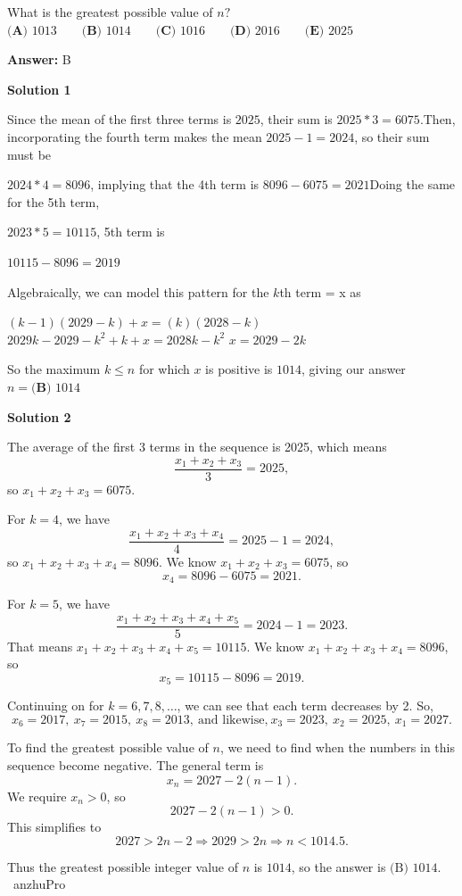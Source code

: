 \begin{enumerate}
 What is the greatest possible value of ${n?}$
$\textbf{(A) } 1013 \qquad \textbf{(B) } 1014 \qquad \textbf{(C) } 1016 \qquad \textbf{(D) } 2016 \qquad \textbf{(E) } 2025$

 \textbf{Answer: }B



\textbf{Solution 1}

Since the mean of the first three terms is $2025$, their sum is $2025 * 3 = 6075$.Then, incorporating the fourth term makes the mean $2025-1=2024$, so their sum must be 

 $2024 * 4 = 8096$, implying that the 4th term is $8096-6075=2021$Doing the same for the 5th term,

 $2023 * 5= 10115$, 5th term is 

 $10115-8096=2019$

 Algebraically, we can model this pattern for the $k$th term = x as

 $(k-1)(2029-k) + x = (k)(2028-k)$
$2029k-2029-k^2+k+x=2028k-k^2$
$x=2029-2k$

 So the maximum $k\le n$ for which $x$ is positive is $1014$, giving our answer $n=\boxed{\textbf{(B) }1014}$




\textbf{Solution 2}

The average of the first 3 terms in the sequence is 2025, which means 
 \[\frac{x_1 + x_2 + x_3}{3} = 2025,\] so $x_1 + x_2 + x_3 = 6075$.

 For $k = 4$, we have 
 \[\frac{x_1 + x_2 + x_3 + x_4}{4} = 2025 - 1 = 2024,\] so $x_1 + x_2 + x_3 + x_4 = 8096$. We know $x_1 + x_2 + x_3 = 6075$, so 
 \[x_4 = 8096 - 6075 = 2021.\]

 For $k = 5$, we have 
 \[\frac{x_1 + x_2 + x_3 + x_4 + x_5}{5} = 2024 - 1 = 2023.\] That means $x_1 + x_2 + x_3 + x_4 + x_5 = 10115$. We know $x_1 + x_2 + x_3 + x_4 = 8096$, so 
 \[x_5 = 10115 - 8096 = 2019.\]

 Continuing on for $k = 6, 7, 8, \ldots$, we can see that each term decreases by 2. So, 
 \[x_6 = 2017,\ x_7 = 2015,\ x_8 = 2013,\ \text{and likewise,}\ x_3 = 2023,\ x_2 = 2025,\ x_1 = 2027.\]

 To find the greatest possible value of $n$, we need to find when the numbers in this sequence become negative. The general term is 
 \[x_n = 2027 - 2(n-1).\] We require $x_n > 0$, so 
 \[2027 - 2(n-1) > 0.\] This simplifies to 
 \[2027 > 2n - 2 \Rightarrow 2029 > 2n \Rightarrow n < 1014.5.\]

 Thus the greatest possible integer value of $n$ is $1014$, so the answer is $\text{(B) } 1014$. ~anzhuPro


\end{enumerate}
